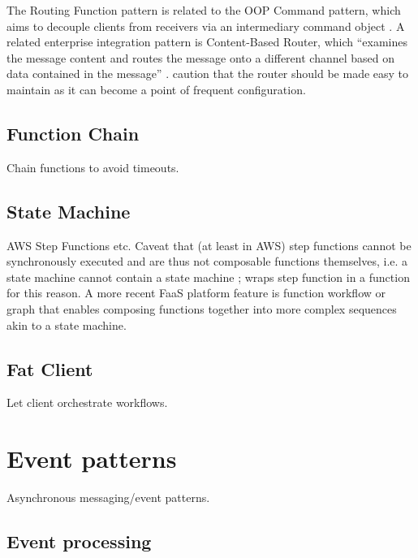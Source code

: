 The Routing Function pattern is related to the OOP Command pattern, which aims to decouple clients from receivers via an intermediary command object \parencite{gamma94designPatterns}. A related enterprise integration pattern is Content-Based Router, which ``examines the message content and routes the message onto a different channel based on data contained in the message'' \parencite{hohpe2004enterprise}. \textcite{hohpe2004enterprise} caution that the router should be made easy to maintain as it can become a point of frequent configuration.

\subsection{Function Chain} \label{subsec:functionChain}

Chain functions to avoid timeouts.

\subsection{State Machine} \label{subsec:stateMachine}

AWS Step Functions etc. Caveat that (at least in AWS) step functions cannot be synchronously executed and are thus not composable functions themselves, i.e. a state machine cannot contain a state machine \parencite{lopez18orchestration}; \textcite{daly18blogPatterns} wraps step function in a function for this reason.
A more recent FaaS platform feature is function workflow or graph that enables composing functions together into more complex sequences akin to a state machine.

\subsection{Fat Client} \label{subsec:fatClient}

Let client orchestrate workflows.

\section{Event patterns} \label{sec:eventPatterns}

Asynchronous messaging/event patterns.

\subsection{Event processing} \label{subsec:Eventprocessing}

